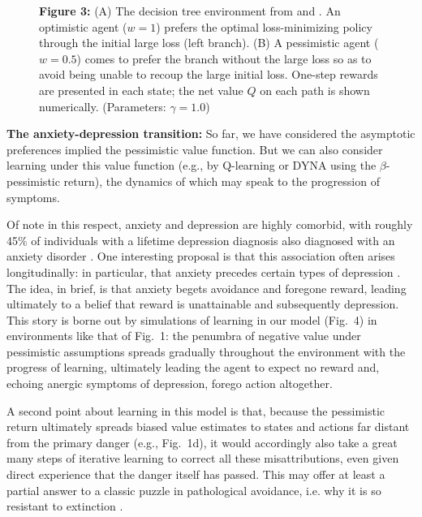 \documentclass[11pt]{article} %
\begin{document}
\begin{figure}[!b]
  \centerline{%
  }
  \par \textbf{Figure 3:} (A) The decision tree environment from \cite{Huys2012} and \cite{Lally2017}. An optimistic agent ($w=1$) prefers the optimal loss-minimizing policy through the initial large loss (left branch). (B) A pessimistic agent ($w=0.5$) comes to prefer the branch without the large loss so as to avoid being unable to recoup the large initial loss. One-step rewards are presented in each state; the net value $Q$ on each path is shown numerically. (Parameters: $\gamma = 1.0$)
\end{figure}

\textbf{The anxiety-depression transition:} So far, we have considered the asymptotic preferences implied the pessimistic value function. But we can also consider learning under this value function (e.g., by Q-learning or DYNA using the $\beta$-pessimistic return), the dynamics of which may speak to the progression of symptoms.

Of note in this respect, anxiety and depression are highly comorbid, with roughly 45\% of individuals with a lifetime depression diagnosis also diagnosed with an anxiety disorder \citep{kessler2015}. One interesting proposal is that this association often arises longitudinally: in particular, that anxiety precedes certain types of depression \citep{alloy1990, jacobson2014}. The idea, in brief, is that anxiety begets avoidance and foregone reward, leading ultimately to a belief that reward is unattainable and subsequently depression. This story is borne out by simulations of learning in our model (Fig.~4) in environments like that of Fig.~1: the penumbra of negative value under pessimistic assumptions spreads gradually throughout the environment with the progress of learning, ultimately leading the agent to expect no reward and, echoing anergic symptoms of depression, forego action altogether.

A second point about learning in this model is that, because the pessimistic return ultimately spreads biased value estimates to states and actions far distant from the primary danger (e.g., Fig.~1d), it would accordingly also take a great many steps of iterative learning to correct all these misattributions, even given direct experience that the danger itself has passed. This may offer at least a partial answer to a classic puzzle in pathological avoidance, i.e. why it is so resistant to extinction \cite{moutoussis2018}.
\end{document}
